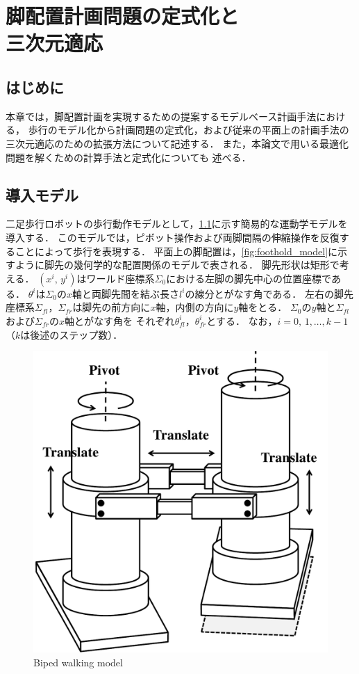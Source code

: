\documentclass[autodetect-engine,dvipdfmx-if-dvi,ja=standard,a4j,jbase=11pt,magstyle=nomag*]{bxjsreport}
\begin{document}
\chapter[脚配置計画問題の定式化と三次元適応]{脚配置計画問題の定式化と\\三次元適応}

\section{はじめに}
本章では，脚配置計画を実現するための提案するモデルベース計画手法における，
歩行のモデル化から計画問題の定式化，および従来の平面上の計画手法の
三次元適応のための拡張方法について記述する．
また，本論文で用いる最適化問題を解くための計算手法と定式化についても
述べる．

\section{導入モデル}
二足歩行ロボットの歩行動作モデルとして，\cref{fig:kinematic_model}に示す簡易的な運動学モデルを導入する．
このモデルでは，ピボット操作および両脚間隔の伸縮操作を反復することによって歩行を表現する．
平面上の脚配置は，\cref{fig:foothold_model}に示すように脚先の幾何学的な配置関係のモデルで表される．
脚先形状は矩形で考える．
$( x^i ,\, y^i )$はワールド座標系$\Sigma_0$における左脚の脚先中心の位置座標である．
$\theta^i$は$\Sigma_0$の$x$軸と両脚先間を結ぶ長さ$l^i$の線分とがなす角である．
左右の脚先座標系$\Sigma_{fl}$，$\Sigma_{fr}$は脚先の前方向に$x$軸，内側の方向に$y$軸をとる． 
$\Sigma_0$の$y$軸と$\Sigma_{fl}$および$\Sigma_{fr}$の$x$軸とがなす角を
それぞれ$\theta_{fl}^i$，$\theta_{fr}^i$とする．
なお，$i = 0 ,\, 1, \dots, k - 1$（$k$は後述のステップ数）．

\begin{figure}[t]
    \centering
    \includegraphics[width=0.75\linewidth, clip]{./figure/model_kinematic.pdf}
    \caption{Biped walking model}
    \label{fig:kinematic_model}
\end{figure}
\end{document}
